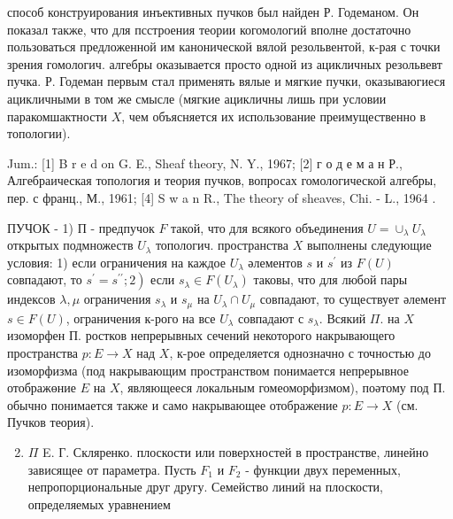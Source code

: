 \documentclass[10pt]{article}
\begin{document}
способ конструирования инъективных пучков был найден Р. Годеманом. Он показал также, что для псстроения теории когомологий вполне достаточно пользоваться предложенной им канонической вялой резольвентой, к-рая с точки зрения гомологич. алгебры оказывается просто одной из ацикличных резольвевт пучка. Р. Годеман первым стал применять вялые и мягкие пучки, оказываюгиеся ацикличными в том же смысле (мягкие ацикличны лишь при условии паракомшактности $X$, чем объясняется их использование преимущественно в топологии).



Jum.: [1] B r e d on G. E., Sheaf theory, N. Y., 1967; [2] г о д е м а н Р., Алгебраическая топология и теория пучков, вопросах гомологической алгебры, пер. с франц., М., 1961; [4] S w a n R., The theory of sheaves, Chi. - L., 1964 .



ПУЧОК - 1) П - предпучок $F$ такой, что для всякого объединения $U=\cup_{\lambda} U_{\lambda}$ открытых подмножеств $U_{\lambda}$ топологич. пространства $X$ выполнены следующие условия: 1) если ограничения на каждое $U_{\lambda}$ әлементов $s$ и $s^{\prime}$ из $F(U)$ совпадают, то $\left.s^{\prime}=s^{\prime \prime} ; 2\right)$ если $s_{\lambda} \in F\left(U_{\lambda}\right)$ таковы, что для любой пары индексов $\lambda, \mu$ ограничения $s_{\lambda}$ и $s_{\mu}$ на $U_{\lambda} \cap U_{\mu}$ совпадают, то существует әлемент $s \in F(U)$, ограничения к-рого на все $U_{\lambda}$ совпадают с $s_{\lambda}$. Всякий $\Pi$. на $X$ изоморфен П. ростков непрерывных сечений некоторого накрывающего пространства $p: E \rightarrow X$ над $X$, к-рое определяется однозначно с точностью до изоморфизма (под накрывающим пространством понимается непрерывное отображөние $E$ на $X$, являющееся локальным гомеоморфизмом), поәтому под П. обычно понимается также и само накрывающее отображение $p: E \rightarrow X$ (см. Пучков теория).



\begin{enumerate}

  \setcounter{enumi}{1}

  \item $\Pi$ E. Г. Скляренко. плоскости или поверхностей в пространстве, линейно зависящее от параметра. Пусть $F_{1}$ и $F_{2}$ - функции двух переменных, непропорциональные друг другу. Семейство линий на плоскости, определяемых уравнением

\end{enumerate}
\end{document}
